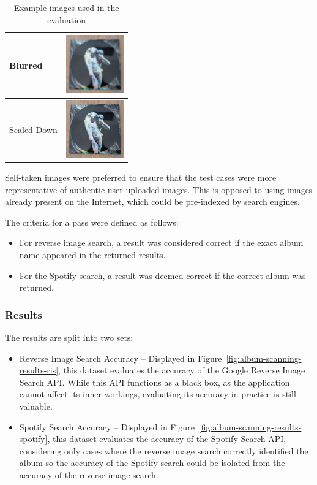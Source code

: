 \begin{table} [H]
\begin{subtable}{0.48\textwidth}
\begin{tabular}{|m{2.5cm}|m{2.5cm}|}
            \hline
            Blurred & \includegraphics[width=2.5cm]{figures/test_albums/Reflektor_Blurred.jpg} \\
            \hline
            Scaled Down & \includegraphics[width=2.5cm]{figures/test_albums/Reflektor_Scaled.jpg} \\
            \hline
        \end{tabular}
    \end{subtable}

    \caption{Example images used in the evaluation}
    \label{tab:image-evaluation-examples}
\end{table}

Self-taken images were preferred to ensure that the test cases were more representative of authentic user-uploaded images. This is opposed to using images already present on the Internet, which could be pre-indexed by search engines.

The criteria for a pass were defined as follows:
\begin{itemize}
    \item For reverse image search, a result was considered correct if the exact album name appeared in the returned results.
    \item For the Spotify search, a result was deemed correct if the correct album was returned.
\end{itemize}

\subsubsection{Results}
The results are split into two sets:
\begin{itemize}
    \item Reverse Image Search Accuracy – Displayed in Figure~\ref{fig:album-scanning-results-ris}, this dataset evaluates the accuracy of the Google Reverse Image Search API. While this API functions as a black box, as the application cannot affect its inner workings, evaluating its accuracy in practice is still valuable.
    \item Spotify Search Accuracy – Displayed in Figure~\ref{fig:album-scanning-results-spotify}, this dataset evaluates the accuracy of the Spotify Search API, considering only cases where the reverse image search correctly identified the album so the accuracy of the Spotify search could be isolated from the accuracy of the reverse image search.
\end{itemize}

